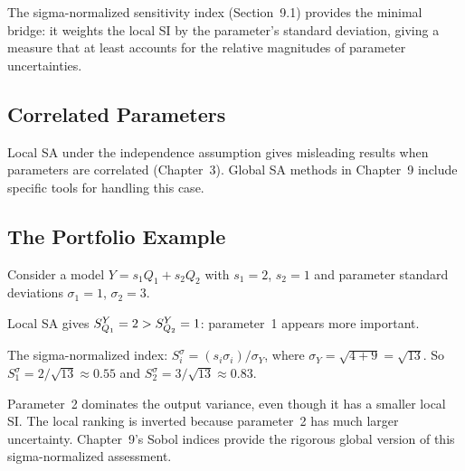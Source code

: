 The sigma-normalized sensitivity index (Section~9.1) provides
the minimal bridge: it weights the local SI by the parameter's
standard deviation, giving a measure that at least accounts for
the relative magnitudes of parameter uncertainties.

\subsection{Correlated Parameters}

Local SA under the independence assumption gives misleading results
when parameters are correlated (Chapter~3). Global SA methods in
Chapter~9 include specific tools for handling this case.

\subsection{The Portfolio Example}

Consider a model $Y = s_1 Q_1 + s_2 Q_2$ with $s_1 = 2$, $s_2 = 1$
and parameter standard deviations $\sigma_1 = 1$, $\sigma_2 = 3$.

Local SA gives $S_{Q_1}^{Y} = 2 > S_{Q_2}^{Y} = 1$:
parameter~1 appears more important.

The sigma-normalized index:
$S_i^\sigma = (s_i\sigma_i)/\sigma_Y$,
where $\sigma_Y = \sqrt{4+9} = \sqrt{13}$.
So $S_1^\sigma = 2/\sqrt{13} \approx 0.55$ and $S_2^\sigma = 3/\sqrt{13} \approx 0.83$.

Parameter~2 dominates the output variance, even though it has a smaller
local SI. The local ranking is inverted because parameter~2 has much
larger uncertainty. Chapter~9's Sobol indices provide the rigorous
global version of this sigma-normalized assessment.

